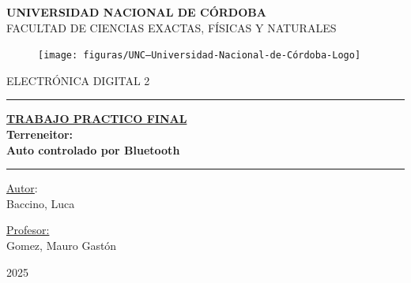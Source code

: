 \documentclass[]{article}
\begin{document}
	
	
	\thispagestyle{empty} 
	
	\begin{center} %
		\Large{\textbf{UNIVERSIDAD NACIONAL DE CÓRDOBA}} \\
		\large{FACULTAD DE CIENCIAS EXACTAS, FÍSICAS Y NATURALES}
	\end{center}
	
	\begin{figure}[h] %
		\centering
		\texttt{[image: figuras/UNC---Universidad-Nacional-de-Córdoba-Logo]}
	\end{figure}
	
	\vspace{1cm}
	
	\begin{center} 
		\large{ELECTRÓNICA DIGITAL 2} \\[0.5cm]
	\end{center}
	
	\hrule
	
	\begin{center}
		\textbf{\underline{\Large{TRABAJO PRACTICO FINAL}}}\\[0.5cm] 
		\textbf{\Large{Terreneitor:\\
				Auto controlado por Bluetooth}} 
	\end{center}
	
	\hrule
	
	\vspace{2cm}
	
	\begin{center} %
		\Large \underline{Autor}: \\
		\Large{Baccino, Luca}
	\end{center}
	
	\vspace{1cm}
	
	\begin{center} %
		\Large \underline{Profesor:} \\
		\Large{Gomez, Mauro Gastón} \\
	\end{center}	
	
	\vspace{1cm}
	
	\begin{center} %
		\Large{2025}
	\end{center}
	\newpage
	\thispagestyle{fancy}
	
\end{document}
